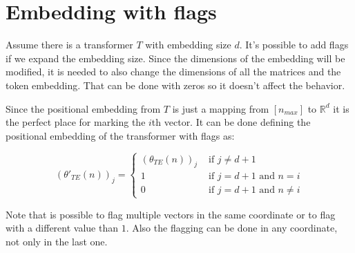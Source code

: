 \section*{Embedding with flags}


Assume there is a transformer $T$ with embedding size $d$. 
It's possible to add flags if we expand the embedding size. 
Since the dimensions of the embedding will be modified, it is needed to also change the dimensions of all the matrices and the token embedding. That can be done with zeros so it doesn't affect the behavior.

Since the positional embedding from $T$ is just a mapping from $[n_{max}]$ to $\mathbb{R}^d$ it is the perfect place for marking the $i$th vector. It can be done defining the positional embedding of the transformer with flags as:

\begin{equation*}
    (\theta'_{TE}(n))_j = \begin{cases}
        (\theta_{TE}(n))_j  & \text{ if } j \neq d+1 \\
        1                   & \text{ if } j = d+1  \text{ and } n = i \\
        0                   & \text{ if } j = d+1  \text{ and } n \neq i
    \end{cases}
\end{equation*}

Note that is possible to flag multiple vectors in the same coordinate or to flag with a different value than $1$. Also the flagging can be done in any coordinate, not only in the last one.

